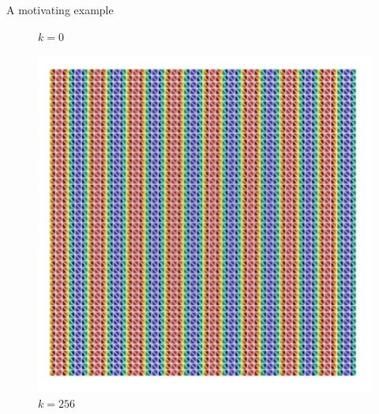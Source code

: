 \documentclass[]{beamer}
\begin{document}
\begin{frame}{A motivating example}
{\begin{minipage}{0.3\textwidth}
\begin{figure}
					\caption{$k=0$}
				\end{figure}
			\end{minipage}
			\begin{minipage}{0.3\textwidth}
				\begin{figure}
					\centering
					\includegraphics[scale=0.3]{Figures/helmholtz_N_48_omega_16.png}
					\caption{$k=256$}
				\end{figure}
			\end{minipage}
		}
	\end{frame}
\end{document}
